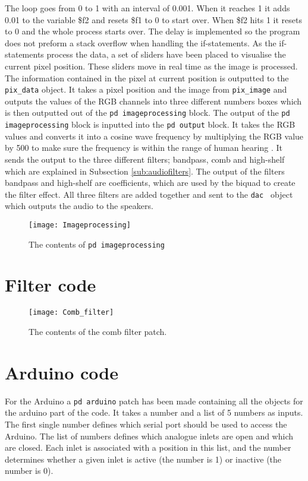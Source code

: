 The loop goes from 0 to 1 with an interval of 0.001. When it reaches 1 it adds 0.01 to the variable \$f2 and resets \$f1 to 0 to start over. When \$f2 hits 1 it resets to 0 and the whole process starts over. The delay is implemented so the program does not preform a stack overflow when handling the if-statements. 
As the if-statements process the data, a set of sliders have been placed to visualise the current pixel position. These sliders move in real time as the image is processed. The information contained in the pixel at current position is outputted to the \texttt{pix\_data} object. It takes a pixel position and the image from \texttt{pix\_image} and outputs the values of the RGB channels into three different numbers boxes which is then outputted out of the \texttt{pd imageprocessing} block. The output of the \texttt{pd imageprocessing} block is inputted into the \texttt{pd output} block. It takes the RGB values and converts it into a cosine wave frequency by multiplying the RGB value by 500 to make sure the frequency is within the range of human hearing \cite{steiglitz1997digital}. It sends the output to the three different filters; bandpass, comb and high-shelf which are explained in Subsection \ref{sub:audiofilters}. The output of the filters bandpass and high-shelf are coefficients, which are used by the biquad to create the filter effect. All three filters are added together and sent to the \texttt{dac~} object which outputs the audio to the speakers. 

\begin{figure}
\centering
\texttt{[image: Imageprocessing]}
\caption{The contents of \texttt{pd imageprocessing}}
\label{Fig:Imageprocessing}
\end{figure}

\section{Filter code}

\begin{figure}
\centering
\texttt{[image: Comb\_filter]}
\caption{The contents of the comb filter patch.}
\label{Fig:Comb_filter}
\end{figure}

\section{Arduino code}
For the Arduino a \texttt{pd arduino} patch has been made containing all the objects for the arduino part of the code. It takes a number and a list of 5 numbers as inputs. The first single number defines which serial port should be used to access the Arduino. The list of numbers defines which analogue inlets are open and which are closed. Each inlet is associated with a position in this list, and the number determines whether a given inlet is active (the number is 1) or inactive (the number is 0).

